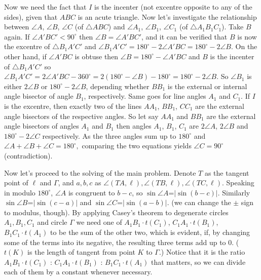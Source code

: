 \documentclass[11pt,a4paper]{article}
\begin{document}
\begin{enumerate}
	Now we need the fact that $I$ is the incenter (not excentre opposite to any of the sides), given that $ABC$ is an acute triangle. Now let's investigate the relationship between $\angle A$, $\angle B$, $\angle C$ (of $\triangle ABC$) and $\angle A_1$, $\angle B_1$, $\angle C_1$ (of $\triangle A_1B_1C_1$). Take $B$ again. If $\angle A'BC'<90^{\circ}$ then $\angle B=\angle A'BC'$, and it can be verified that $B$ is now the excentre of $\triangle B_1A'C'$ and $\angle B_1A'C'=180^{\circ}-2\angle A'BC=180^{\circ}-2\angle B$. On the other hand, if $\angle A'BC$ is obtuse then $\angle B=180^{\circ}-\angle A'BC$ and $B$ is the incenter of $\triangle B_1A'C'$ so $\angle B_1A'C'=2\angle A'BC-360^{\circ}=2(180^{\circ}-\angle B)-180^{\circ}=180^{\circ}-2\angle B.$ So $\angle B_1$ is either $2\angle B$ or $180^{\circ}-2\angle B$, depending whether $BB_1$ is the external or internal angle bisector of angle $B_1$, respectively. Same goes for line angles $A_1$ and $C_1$. If $I$ is the excentre, then exactly two of the lines $AA_1$, $BB_1$, $CC_1$ are the external angle bisectors of the respective angles. So let say $AA_1$ and $BB_1$ are the external angle bisectors of angles $A_1$ and $B_1$ then angles $A_1$, $B_1$, $C_1$ are $2\angle A$, $2\angle B$ and $180^{\circ}-2\angle C$ respectively. As the three angles sum up to $180^{\circ}$ and $\angle A+\angle B+\angle C=180^{\circ},$ comparing the two equations yields $\angle C=90^{\circ}$ (contradiction).
	
	Now let's proceed to the solving of the main problem. Denote $T$ as the tangent point of $\ell$ and $\Gamma$, and $a,b,c$ as $\angle (TA,\ell),\angle (TB,\ell),\angle (TC,\ell)$. Speaking in modulo $180^{\circ}$, $\angle A$ is congruent to $b-c$, so $\sin\angle A$=$|\sin (b-c)|$. Similarly $\sin\angle B$=$|\sin (c-a)|$ and $\sin\angle C$=$|\sin (a-b)|.$ (we can change the $\pm$ sign to modulus, though). By applying Casey's theorem to degenerate circles $A_1, B_1, C_1$ and circle $\Gamma$ we need one of $A_1B_1\cdot t(C_1)$, $C_1A_1\cdot t(B_1)$, $B_1C_1\cdot t(A_1)$ to be the sum of the other two, which is evident, if, by changing some of the terms into its negative, the resulting three terms add up to 0. ($t(K)$ is the length of tangent from point $K$ to $\Gamma$.) Notice that it is the ratio $A_1B_1\cdot t(C_1)$ : $C_1A_1\cdot t(B_1)$ : $B_1C_1\cdot t(A_1)$ that matters, so we can divide each of them by a constant whenever necessary.
	

\end{enumerate}
\end{document}
